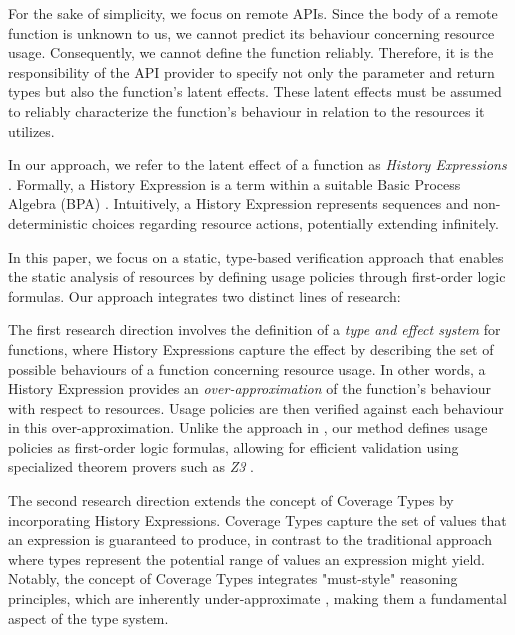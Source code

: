 For the sake of simplicity, we focus on remote APIs. Since the body of a remote function is unknown to us, we cannot predict its behaviour concerning resource usage. Consequently, we cannot define the function reliably. Therefore, it is the responsibility of the API provider to specify not only the parameter and return types but also the function's latent effects. These latent effects must be assumed to reliably characterize the function’s behaviour in relation to the resources it utilizes.

In our approach, we refer to the latent effect of a function as \emph{History Expressions} \cite{history2,history3,history}. Formally, a History Expression is a term within a suitable Basic Process Algebra (BPA) \cite{bpa}. Intuitively, a History Expression represents sequences and non-deterministic choices regarding resource actions, potentially extending infinitely.

In this paper, we focus on a static, type-based verification approach that enables the static analysis of resources by defining usage policies through first-order logic formulas. Our approach integrates two distinct lines of research:

The first research direction involves the definition of a \emph{type and effect system} \cite{types-effects-general,static3-types-effects} for functions, where History Expressions capture the effect by describing the set of possible behaviours of a function concerning resource usage. In other words, a History Expression provides an \emph{over-approximation} of the function's behaviour with respect to resources. Usage policies are then verified against each behaviour in this over-approximation. Unlike the approach in \cite{history}, our method defines usage policies as first-order logic formulas, allowing for efficient validation using specialized theorem provers such as \emph{Z3} \cite{z3}.

The second research direction extends the concept of Coverage Types \cite{coverage} by incorporating History Expressions. Coverage Types capture the set of values that an expression is guaranteed to produce, in contrast to the traditional approach where types represent the potential range of values an expression might yield. Notably, the concept of Coverage Types integrates "must-style" reasoning principles, which are inherently under-approximate \cite{IL1,IL2}, making them a fundamental aspect of the type system.

